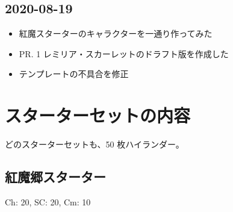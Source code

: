 \documentclass[line_length=22zw,number_of_lines=45,twocolumn]{jlreq}
\begin{document}
\subsection{2020-08-19}
\begin{itemize}
	\item 紅魔スターターのキャラクターを一通り作ってみた
	\item PR. 1 レミリア・スカーレットのドラフト版を作成した
	\item テンプレートの不具合を修正
\end{itemize}

\section{スターターセットの内容}
どのスターターセットも、50 枚ハイランダー。
\clearpage\small
\subsection{紅魔郷スターター}
Ch: 20, SC: 20, Cm: 10
\end{document}
